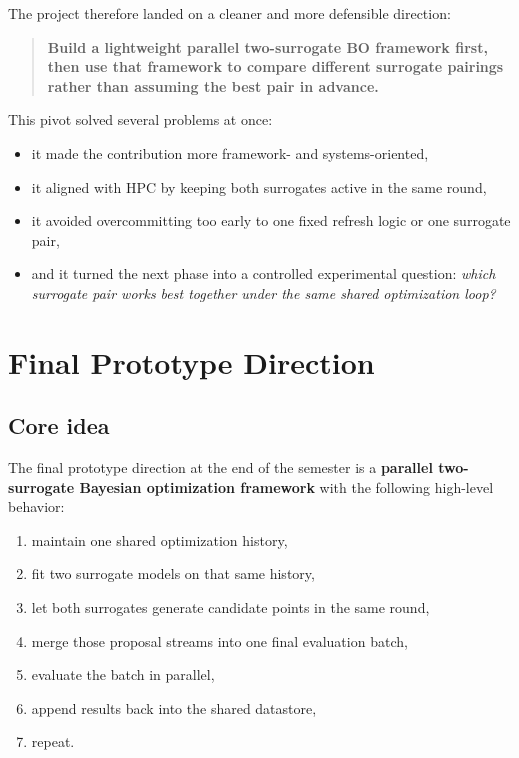 \documentclass[11pt]{article}
\begin{document}
The project therefore landed on a cleaner and more defensible direction:
\begin{quote}
\textbf{Build a lightweight parallel two-surrogate BO framework first, then use that framework to compare different surrogate pairings rather than assuming the best pair in advance.}
\end{quote}

This pivot solved several problems at once:
\begin{itemize}[leftmargin=1.5em]
    
    \item it made the contribution more framework- and systems-oriented,
    \item it aligned with HPC by keeping both surrogates active in the same round,
    \item it avoided overcommitting too early to one fixed refresh logic or one surrogate pair,
    \item and it turned the next phase into a controlled experimental question: \emph{which surrogate pair works best together under the same shared optimization loop?}
\end{itemize}

\section{Final Prototype Direction}

\subsection{Core idea}

The final prototype direction at the end of the semester is a \textbf{parallel two-surrogate Bayesian optimization framework} with the following high-level behavior:
\begin{enumerate}[leftmargin=1.5em]
    \item maintain one shared optimization history,
    \item fit two surrogate models on that same history,
    \item let both surrogates generate candidate points in the same round,
    \item merge those proposal streams into one final evaluation batch,
    \item evaluate the batch in parallel,
    \item append results back into the shared datastore,
    \item repeat.
\end{enumerate}
\end{document}
